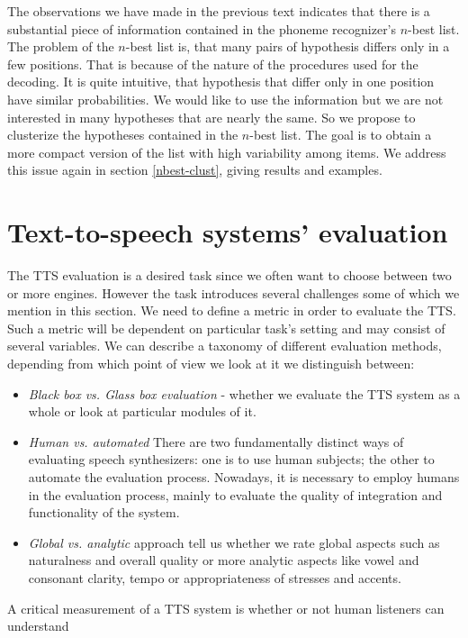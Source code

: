 \par
The observations we have made in the previous text indicates that there is a substantial piece of information contained in the phoneme recognizer's $n$-best list.
The problem of the $n$-best list is, that many pairs of hypothesis differs only in a few positions.
That is because of the nature of the procedures used for the decoding.
It is quite intuitive, that hypothesis that differ only in one position have similar probabilities.
We would like to use the information but we are not interested in many hypotheses that are nearly the same.
So we propose to clusterize the hypotheses contained in the $n$-best list.
The goal is to obtain a more compact version of the list with high variability among items.
We address this issue again in section \ref{nbest-clust}, giving results and examples.  
\section{Text-to-speech systems' evaluation}
\label{tts-eval}
The TTS evaluation\cite{huang2001spoken} is a desired task since we often want to choose between two or more engines.
However the task introduces several challenges some of which we mention in this section.
We need to define a metric in order to evaluate the TTS.
Such a metric will be dependent on particular task's setting and may consist of several variables.
We can describe a taxonomy of different evaluation methods, depending from which point of view we look at it we distinguish between:
\begin{itemize}
\item \textit{Black box vs. Glass box evaluation} - whether we evaluate the TTS system as a whole or look at particular modules of it.
\item \textit{Human vs. automated} There are two fundamentally distinct ways of evaluating
speech synthesizers: one is to use human subjects; the other to automate the evaluation process.
Nowadays, it is necessary to employ humans in the evaluation process, mainly to evaluate the quality of integration and functionality of the system.
\item \textit{Global vs. analytic} approach tell us whether we rate global aspects such as naturalness and overall quality or more analytic aspects like vowel and consonant clarity, tempo or appropriateness of stresses and accents.
\end{itemize}
\par
A critical measurement of a TTS system is whether or not human listeners can understand
